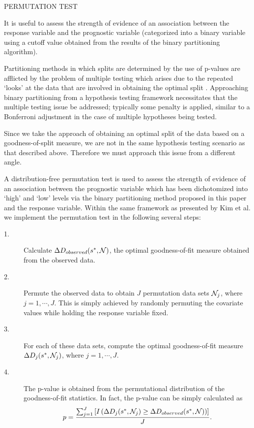 \documentclass{article}
\def\Sumj{{{\sum_{j=1}^{J}}}}
\begin{document}
\begin{center}
{\huge PERMUTATION TEST\\}
\end{center}
\vspace{1cm}
It is useful to assess the strength of evidence of an association between the
response variable and the prognostic variable (categorized into a binary 
variable using a cutoff value obtained from the results of the binary 
partitioning algorithm).

Partitioning methods in which splits are determined by the use of p-values are afflicted by the problem of multiple testing which arises due to the repeated `looks' at the data that are involved in obtaining the optimal split \cite{MG00}.  Approaching binary partitioning from a hypothesis testing framework necessitates that the multiple testing issue be addressed; typically some penalty is applied, similar to a Bonferroni adjustment in the case of multiple hypotheses being tested.

Since we take the approach of obtaining an optimal split of the data
based on a goodness-of-split measure, we are not in the same hypothesis
testing scenario as that described above.  Therefore we must approach this
issue from a different angle.

A distribution-free permutation test \cite{CH74} is used to assess the strength of
evidence of an association between the prognostic variable which has been
dichotomized into `high' and `low' levels via the binary partitioning method
proposed in this paper and the response variable.  Within the same framework
as presented by Kim et al. \cite{KFFM00} we implement the permutation test in 
the following several steps:
\begin{description}
\item[1.]  Calculate $\Delta D_{observed} (s^{*},{\cal N})$, the optimal 
goodness-of-fit measure obtained from the observed data.
\item[2.] Permute the observed data to obtain $J$ permutation data sets 
${\cal N}_{j}$, where $j=1, \cdots, J$. This is simply achieved by randomly
permuting the covariate values while holding the response variable fixed.
\item[3.] For each of these data sets, compute the optimal goodness-of-fit 
measure $\Delta D_{j} (s^{*},{\cal N}_{j})$, where $j=1, \cdots, J$.
\item[4.] The p-value is obtained from the permutational distribution of the
goodness-of-fit statistics.  In fact, the p-value can be simply calculated as 
\begin{eqnarray*}
p = \frac{ \Sumj \left[ I \left( \Delta D_{j} (s^{*}, {\cal N}_{j}) \geq 
	\Delta D_{observed} (s^{*},{\cal N}) \right) \right] }{J}.
\end{eqnarray*}
\end{description}
\end{document}
